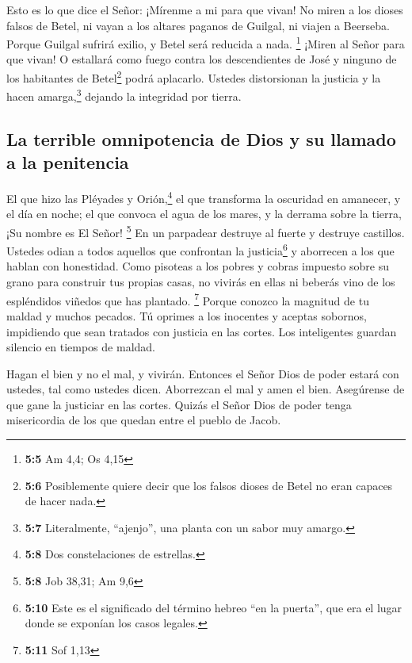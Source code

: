 Esto es lo que dice el Señor: ¡Mírenme a mi para que
vivan!  No miren a los dioses falsos de Betel, ni vayan a
los altares paganos de Guilgal, ni viajen a Beerseba. Porque Guilgal
sufrirá exilio, y Betel será reducida a nada. \footnote{\textbf{5:5} Am
  4,4; Os 4,15}  ¡Miren al Señor para que vivan! O
estallará como fuego contra los descendientes de José y ninguno de los
habitantes de Betel\footnote{\textbf{5:6} Posiblemente quiere decir que
  los falsos dioses de Betel no eran capaces de hacer nada.} podrá
aplacarlo.  Ustedes distorsionan la justicia y la hacen
amarga,\footnote{\textbf{5:7} Literalmente, ``ajenjo'', una planta con
  un sabor muy amargo.} dejando la integridad por tierra.

\hypertarget{la-terrible-omnipotencia-de-dios-y-su-llamado-a-la-penitencia}{%
\subsection{La terrible omnipotencia de Dios y su llamado a la
penitencia}\label{la-terrible-omnipotencia-de-dios-y-su-llamado-a-la-penitencia}}

 El que hizo las Pléyades y Orión,\footnote{\textbf{5:8}
  Dos constelaciones de estrellas.} el que transforma la oscuridad en
amanecer, y el día en noche; el que convoca el agua de los mares, y la
derrama sobre la tierra, ¡Su nombre es El Señor! \footnote{\textbf{5:8}
  Job 38,31; Am 9,6}  En un parpadear destruye al fuerte y
destruye castillos.  Ustedes odian a todos aquellos que
confrontan la justicia\footnote{\textbf{5:10} Este es el significado del
  término hebreo ``en la puerta'', que era el lugar donde se exponían
  los casos legales.} y aborrecen a los que hablan con honestidad.
 Como pisoteas a los pobres y cobras impuesto sobre su
grano para construir tus propias casas, no vivirás en ellas ni beberás
vino de los espléndidos viñedos que has plantado. \footnote{\textbf{5:11}
  Sof 1,13}  Porque conozco la magnitud de tu maldad y
muchos pecados. Tú oprimes a los inocentes y aceptas sobornos,
impidiendo que sean tratados con justicia en las cortes. 
Los inteligentes guardan silencio en tiempos de maldad.

 Hagan el bien y no el mal, y vivirán. Entonces el Señor
Dios de poder estará con ustedes, tal como ustedes dicen.
 Aborrezcan el mal y amen el bien. Asegúrense de que gane
la justiciar en las cortes. Quizás el Señor Dios de poder tenga
misericordia de los que quedan entre el pueblo de Jacob.

